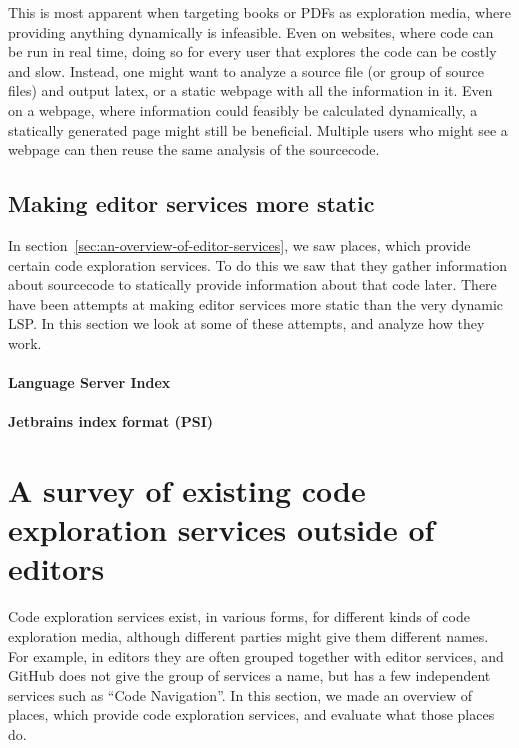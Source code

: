 This is most apparent when targeting books or PDFs as exploration media, where providing anything dynamically is infeasible.
Even on websites, where code can be run in real time, doing so for every user that explores the code can be costly and slow.
Instead, one might want to analyze a source file (or group of source files) and output latex, or a static webpage with all the information in it.
Even on a webpage, where information could feasibly be calculated dynamically, a statically generated page might still be beneficial.
Multiple users who might see a webpage can then reuse the same analysis of the sourcecode.


\subsection{Making editor services more static}\label{subsec:work-towards-making-editor-services-more-static}

In section~\ref{sec:an-overview-of-editor-services}, we saw places, which provide certain code exploration services.
To do this we saw that they gather information about sourcecode to statically provide information about that code later.
There have been attempts at making editor services more static than the very dynamic \ac{LSP}.
In this section we look at some of these attempts, and analyze how they work.

\paragraph{Language Server Index}
\paragraph{Jetbrains index format (PSI)}

\section{A survey of existing code exploration services outside of editors}\label{sec:a-survey-of-existing-code-exploration-services}

Code exploration services exist, in various forms, for different kinds of code exploration media, although different parties might give them different names.
For example, in editors they are often grouped together with editor services, and GitHub does not give the group of
services a name, but has a few independent services such as ``Code Navigation''.
In this section, we made an overview of places, which provide code exploration services, and evaluate what those places do.

